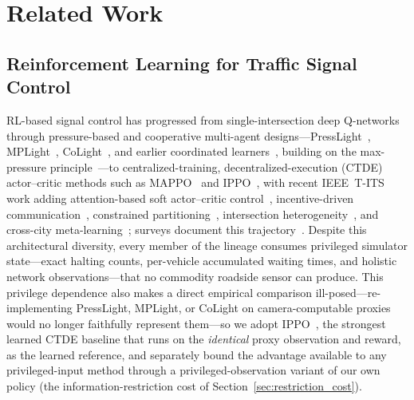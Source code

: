 \section{Related Work}

\subsection{Reinforcement Learning for Traffic Signal Control}
RL-based signal control has progressed from single-intersection deep
Q-networks~\cite{genders2016_drl,wei2018_intellilight} through pressure-based and
cooperative multi-agent designs---PressLight~\cite{wei2019_presslight},
MPLight~\cite{chen2020_mplight}, CoLight~\cite{wei2019_colight}, and earlier
coordinated learners~\cite{vanderpol2016_coordinated}, building on the
max-pressure principle~\cite{varaiya2013_maxpressure}---to centralized-training,
decentralized-execution (CTDE) actor--critic methods such as
MAPPO~\cite{yu2022_mappo} and IPPO~\cite{dewitt2020_ippo}, with recent
IEEE~T-ITS work adding attention-based soft actor--critic
control~\cite{mao2023_masac}, incentive-driven
communication~\cite{zhou2024_micdrl}, constrained
partitioning~\cite{gu2024_partition}, intersection
heterogeneity~\cite{bie2024_heterogeneity}, and cross-city
meta-learning~\cite{jiang2024_xlight}; surveys document this
trajectory~\cite{wei2019_survey,rltsc_review2025,rltsc_survey2026}. Despite this
architectural diversity, every member of the lineage consumes privileged
simulator state---exact halting counts, per-vehicle accumulated waiting times,
and holistic network observations---that no commodity roadside sensor can
produce. This privilege dependence also makes a direct empirical comparison
ill-posed---re-implementing PressLight, MPLight, or CoLight on camera-computable
proxies would no longer faithfully represent them---so we adopt
IPPO~\cite{dewitt2020_ippo}, the strongest learned CTDE baseline that runs on
the \emph{identical} proxy observation and reward, as the learned reference, and
separately bound the advantage available to any privileged-input method through
a privileged-observation variant of our own policy (the information-restriction
cost of Section~\ref{sec:restriction_cost}).

